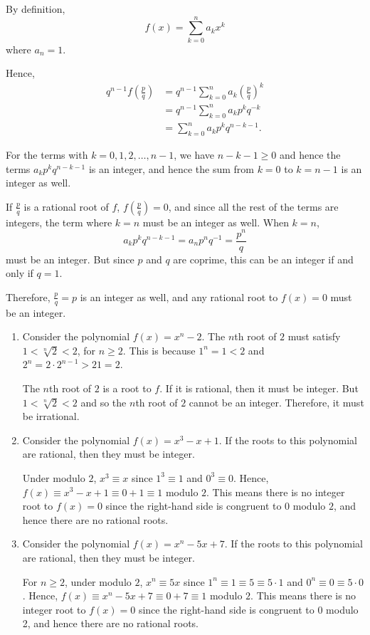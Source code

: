 \Question{\currfilebase}

By definition,
\[
    f(x) = \sum_{k = 0}^{n} a_k x^k
\]
where \(a_n = 1\).

Hence,
\begin{align*}
    q^{n - 1} f\left(\frac{p}{q}\right) & = q^{n - 1} \sum_{k = 0}^{n} a_k \left(\frac{p}{q}\right)^k \\
                                        & = q^{n - 1} \sum_{k = 0}^{n} a_k p^k q^{-k}                 \\
                                        & = \sum_{k = 0}^{n} a_k p^k q^{n - k - 1}.
\end{align*}

For the terms with \(k = 0, 1, 2, \ldots, n - 1\), we have \(n - k - 1 \geq 0\) and hence the terms \(a_k p^k q^{n - k - 1}\) is an integer, and hence the sum from \(k = 0\) to \(k = n - 1\) is an integer as well.

If \(\frac{p}{q}\) is a rational root of \(f\), \(f\left(\frac{p}{q}\right) = 0\), and since all the rest of the terms are integers, the term where \(k = n\) must be an integer as well. When \(k = n\),
\[
    a_k p^k q^{n - k - 1} = a_n p^n q^{-1} = \frac{p^n}{q}
\]
must be an integer. But since \(p\) and \(q\) are coprime, this can be an integer if and only if \(q = 1\).

Therefore, \(\frac{p}{q} = p\) is an integer as well, and any rational root to \(f(x) = 0\) must be an integer.

\begin{enumerate}
    \item Consider the polynomial \(f(x) = x^n - 2\). The \(n\)th root of \(2\) must satisfy \(1 < \sqrt[n]{2} < 2\), for \(n \geq 2\). This is because \(1^n = 1 < 2\) and \(2^n = 2 \cdot 2^{n - 1} > 2 1 = 2\).

          The \(n\)th root of \(2\) is a root to \(f\). If it is rational, then it must be integer. But \(1 < \sqrt[n]{2} < 2\) and so the \(n\)th root of \(2\) cannot be an integer. Therefore, it must be irrational.

    \item Consider the polynomial \(f(x) = x^3 - x + 1\). If the roots to this polynomial are rational, then they must be integer.

          Under modulo \(2\), \(x^3 \equiv x\) since \(1^3 \equiv 1\) and \(0^3 \equiv 0\). Hence, \(f(x) \equiv x^3 - x + 1 \equiv 0 + 1 \equiv 1\) modulo \(2\). This means there is no integer root to \(f(x) = 0\) since the right-hand side is congruent to \(0\) modulo \(2\), and hence there are no rational roots.

    \item Consider the polynomial \(f(x) = x^n - 5x + 7\). If the roots to this polynomial are rational, then they must be integer.

          For \(n \geq 2\), under modulo \(2\), \(x^n \equiv 5x\) since \(1^n \equiv 1 \equiv 5 \equiv 5 \cdot 1\) and \(0^n \equiv 0 \equiv 5 \cdot 0\). Hence, \(f(x) \equiv x^n - 5x + 7 \equiv 0 + 7 \equiv 1\) modulo \(2\). This means there is no integer root to \(f(x) = 0\) since the right-hand side is congruent to \(0\) modulo 2, and hence there are no rational roots.
\end{enumerate}